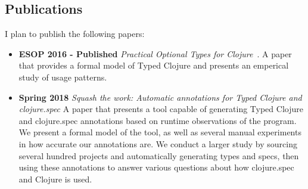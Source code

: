 \documentclass[9pt]{extarticle}
\begin{document}
\subsection{Publications}

I plan to publish the following papers:

\begin{itemize}
  \item \textbf{ESOP 2016 - Published} \emph{Practical Optional Types for Clojure}~\cite{bonnaire2016practical}.
    A paper that provides a formal model of Typed Clojure and presents an emperical
    study of usage patterns.
  \item \textbf{Spring 2018} \emph{Squash the work: Automatic annotations for Typed Clojure and clojure.spec}
    A paper that presents a tool capable of generating Typed Clojure and clojure.spec
    annotations based on runtime observations of the program.
    We present a formal model of the tool, as well as several manual experiments in how
    accurate our annotations are.
    We conduct a larger study by sourcing several hundred projects and automatically
    generating types and specs, then using these annotations to answer various questions
    about how clojure.spec and Clojure is used.
\end{itemize}


\printbibliography
\end{document}
